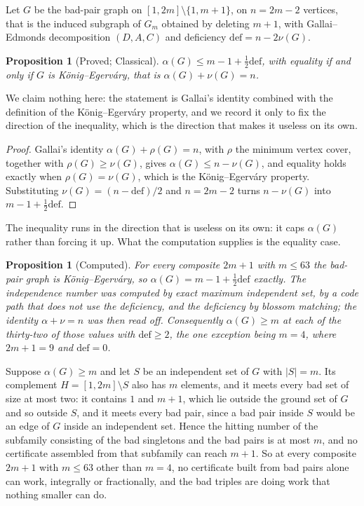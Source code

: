 \documentclass[11pt]{amsart}
\theoremstyle{plain}
\newtheorem{proposition}[theorem]{Proposition}
\theoremstyle{definition}
\begin{document}
Let $G$ be the bad-pair graph on $[1,2m] \setminus \{1,m+1\}$, on $n = 2m-2$ vertices, that is the
induced subgraph of $G_m$ obtained by deleting $m+1$, with
Gallai--Edmonds decomposition $(D,A,C)$ and deficiency $\mathrm{def} = n - 2\nu(G)$.

\begin{proposition}[Proved; Classical]\label{prop:alpha}
$\alpha(G) \le m - 1 + \tfrac12 \mathrm{def}$, with equality if and only if $G$ is
K\"onig--Egerv\'ary, that is $\alpha(G) + \nu(G) = n$.
\end{proposition}

We claim nothing here: the statement is Gallai's identity combined with the definition of the
K\"onig--Egerv\'ary property, and we record it only to fix the direction of the inequality, which
is the direction that makes it useless on its own.

\begin{proof}
Gallai's identity $\alpha(G) + \rho(G) = n$, with $\rho$ the minimum vertex cover, together with
$\rho(G) \ge \nu(G)$, gives $\alpha(G) \le n - \nu(G)$, and equality holds exactly when
$\rho(G) = \nu(G)$, which is the K\"onig--Egerv\'ary property. Substituting
$\nu(G) = (n - \mathrm{def})/2$ and $n = 2m-2$ turns $n - \nu(G)$ into $m - 1 + \tfrac12\mathrm{def}$.
\end{proof}

The inequality runs in the direction that is useless on its own: it caps $\alpha(G)$ rather than
forcing it up. What the computation supplies is the equality case.

\begin{proposition}[Computed]\label{prop:ke}
For every composite $2m+1$ with $m \le 63$ the bad-pair graph is K\"onig--Egerv\'ary, so
$\alpha(G) = m - 1 + \tfrac12\mathrm{def}$ exactly. The independence number was computed by exact
maximum independent set, by a code path that does not use the deficiency, and the deficiency by
blossom matching; the identity $\alpha + \nu = n$ was then read off. Consequently
$\alpha(G) \ge m$ at each of the thirty-two of those values with $\mathrm{def} \ge 2$, the one
exception being $m = 4$, where $2m+1 = 9$ and $\mathrm{def} = 0$.
\end{proposition}

Suppose $\alpha(G) \ge m$ and let $S$ be an independent set of $G$ with $|S| = m$. Its complement
$H = [1,2m] \setminus S$ also has $m$ elements, and it meets every bad set of size at most two:
it contains $1$ and $m+1$, which lie outside the ground set of $G$ and so outside $S$, and it meets
every bad pair, since a bad pair inside $S$ would be an edge of $G$ inside an independent set. Hence
the hitting number of the subfamily consisting of the bad singletons and the bad pairs is at most
$m$, and no certificate assembled from that subfamily can reach $m+1$. So at every composite $2m+1$
with $m \le 63$ other than $m = 4$, no certificate built from bad pairs alone can work, integrally
or fractionally, and the bad triples are doing work that nothing smaller can do.
\end{document}
